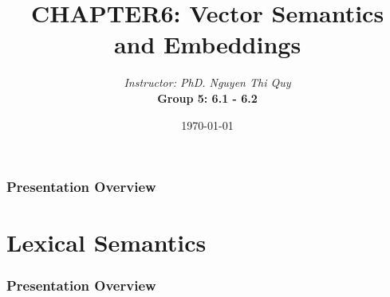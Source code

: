 \documentclass[13.5pt,aspecratio=169, xcolor=dvipsnames]{beamer}
\title{CHAPTER6: Vector Semantics and
Embeddings}
\author[CS221]{\textit{Instructor: PhD. Nguyen Thi Quy}\\ \bigskip \textbf{Group 5: 6.1 - 6.2}}
\date{\today}
\begin{document}
\maketitle



\begin{frame}
    \doublespacing
        \frametitle{Presentation Overview} %
        
        \tableofcontents %
\end{frame}
    
    
    \section{Lexical Semantics} %
    \begin{frame}
        \doublespacing
            \frametitle{Presentation Overview} %
            
            \tableofcontents[currentsection] %
    \end{frame}

\end{document}
